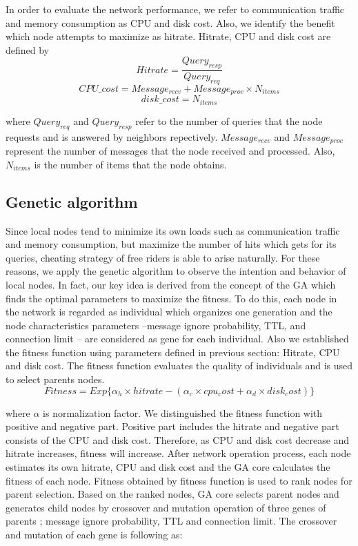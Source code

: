 \documentclass[12pt,journal,draftcls,letterpaper,onecolumn]{IEEEtran}
\begin{document}
In order to evaluate the network performance, we refer to communication traffic and
memory consumption as CPU and disk cost. Also, we identify the benefit which node
attempts to maximize as hitrate. Hitrate, CPU and disk cost are defined by
\[
Hitrate=\frac{Query_{resp}}{Query_{req}}
\]
\[
CPU\_cost=Message_{recv}+Message_{proc} \times N_{items}
\]
\[
disk\_cost=N_{items}
\]

where $Query_{req}$ and $Query_{resp}$ refer to the number of queries that 
the node requests and is answered by neighbors repectively. $Message_{recv}$ and $Message_{proc}$ 
represent the number of messages that the node received and processed. 
Also, $N_{items}$ is the number of items that the node obtains.

\subsection{Genetic algorithm}\label{sec:genetic}
Since local nodes tend to minimize its own loads such as communication traffic and memory
consumption, but maximize the number of hits which gets for its queries, cheating strategy of
free riders is able to arise naturally. For these reasons, we apply the genetic algorithm to
observe the intention and behavior of local nodes. In fact, our key idea is derived from the
concept of the GA which finds the optimal parameters to maximize the fitness. To do this,
each node in the network is regarded as individual which organizes one generation and the
node characteristics parameters –message ignore probability, TTL, and connection limit – are
considered as gene for each individual.
Also we established the fitness function using parameters defined in previous section: Hitrate,
CPU and disk cost. The fitness function evaluates the quality of individuals and is used to
select parents nodes.
\[
Fitness = Exp\{\alpha_{h}\times hitrate-(\alpha_{c}\times cpu_cost + \alpha_{d}\times disk_cost)\}
\]

where $\alpha$ is normalization factor. We distinguished the fitness function with positive and
negative part. Positive part includes the hitrate and negative part consists of the CPU and disk
cost. Therefore, as CPU and disk cost decrease and hitrate increases, fitness will increase.
After network operation process, each node estimates its own hitrate, CPU and disk cost and
the GA core calculates the fitness of each node. Fitness obtained by fitness function is used to
rank nodes for parent selection. Based on the ranked nodes, GA core selects parent nodes and
generates child nodes by crossover and mutation operation of three genes of parents ;
message ignore probability, TTL and connection limit. The crossover and mutation of each
gene is following as:\\
\end{document}
